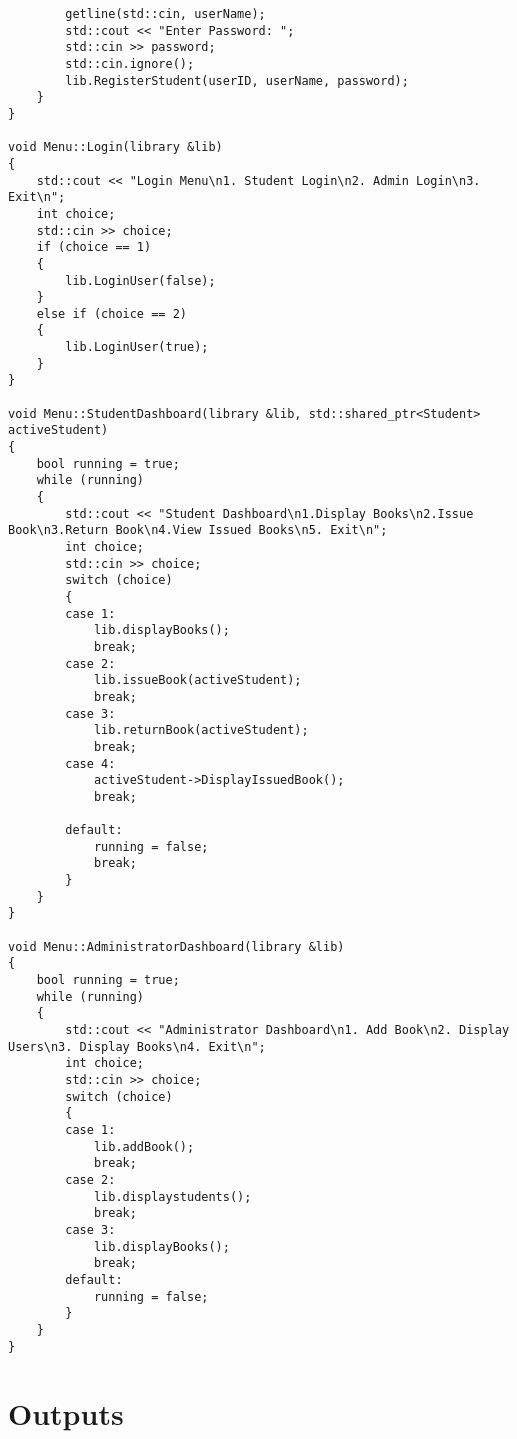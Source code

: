 \documentclass[12pt,a4paper]{report}
\begin{document}
\begin{verbatim}
        getline(std::cin, userName);
        std::cout << "Enter Password: ";
        std::cin >> password;
        std::cin.ignore();
        lib.RegisterStudent(userID, userName, password);
    }
}

void Menu::Login(library &lib)
{
    std::cout << "Login Menu\n1. Student Login\n2. Admin Login\n3. Exit\n";
    int choice;
    std::cin >> choice;
    if (choice == 1)
    {
        lib.LoginUser(false);
    }
    else if (choice == 2)
    {
        lib.LoginUser(true);
    }
}

void Menu::StudentDashboard(library &lib, std::shared_ptr<Student> activeStudent)
{
    bool running = true;
    while (running)
    {
        std::cout << "Student Dashboard\n1.Display Books\n2.Issue Book\n3.Return Book\n4.View Issued Books\n5. Exit\n";
        int choice;
        std::cin >> choice;
        switch (choice)
        {
        case 1:
            lib.displayBooks();
            break;
        case 2:
            lib.issueBook(activeStudent);
            break;
        case 3:
            lib.returnBook(activeStudent);
            break;
        case 4:
            activeStudent->DisplayIssuedBook();
            break;

        default:
            running = false;
            break;
        }
    }
}

void Menu::AdministratorDashboard(library &lib)
{
    bool running = true;
    while (running)
    {
        std::cout << "Administrator Dashboard\n1. Add Book\n2. Display Users\n3. Display Books\n4. Exit\n";
        int choice;
        std::cin >> choice;
        switch (choice)
        {
        case 1:
            lib.addBook();
            break;
        case 2:
            lib.displaystudents();
            break;
        case 3:
            lib.displayBooks();
            break;
        default:
            running = false;
        }
    }
}
\end{verbatim}
\chapter{Outputs}
\end{document}
